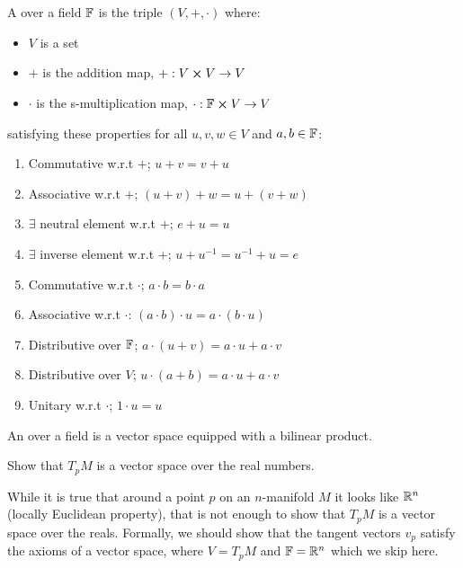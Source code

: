\documentclass[10pt]{article}
\begin{document}
\begin{definition}
\\\\
A  over a field $\mathbb{F}$ is the triple $(V, +, \cdot)$ where:
\begin{itemize}
	\item $V$ is a set
	\item $+$ is the addition map, $+:V \cross V \to V$
	\item $\cdot$ is the s-multiplication map, $\cdot:\mathbb{F} \cross V \to V$
\end{itemize}
satisfying these properties for all $u,v,w \in V$ and $a,b \in \mathbb{F}$:
\begin{enumerate}
	\item Commutative w.r.t $+$; $u+v = v+u$
	\item Associative w.r.t $+$; $(u+v)+w = u+(v+w)$
	\item $\exists$ neutral element w.r.t $+$; $e+u = u$ 
	\item $\exists$ inverse element w.r.t $+$; $u+u^{-1}=u^{-1}+u=e$
	\item Commutative w.r.t $\cdot$; $a\cdot b = b\cdot a$
	\item Associative w.r.t $\cdot$: $(a\cdot b)\cdot u = a\cdot (b\cdot u)$
	\item Distributive over $\mathbb{F}$; $a \cdot(u+v) = a \cdot u+a \cdot v$
	\item Distributive over $V$; $u \cdot(a+b) = a \cdot u+a \cdot v$
	\item Unitary w.r.t $\cdot$; $1\cdot u = u$
\end{enumerate}
An  over a field is a vector space equipped with a bilinear product.
\end{definition}


\begin{example}
	Show that $T_pM$ is a vector space over the real numbers.
\end{example}
\sol While it is true that around a point $p$ on an $n$-manifold $M$ it looks like $\mathbb{R}^n$ (locally Euclidean property), that is not enough to show that $T_pM$ is a vector space over the reals. Formally, we should show that the tangent vectors $v_p$ satisfy the axioms of a vector space, where $V = T_pM$ and $\mathbb{F} = \mathbb{R}^n$ which we skip here.
\end{document}

